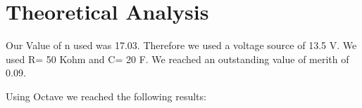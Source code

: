 \section{Theoretical Analysis}
\label{sec:analysis}

Our Value of n used was 17.03.
Therefore we used a voltage source of 13.5 V.
We used R= 50 Kohm and C= 20 F.
We reached an outstanding value of merith of 0.09.


Using Octave we reached the following results:
